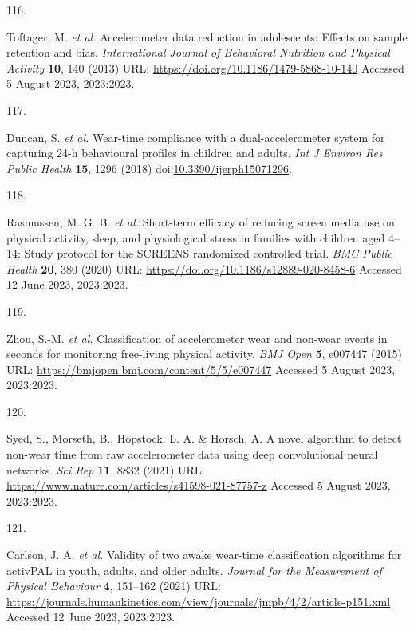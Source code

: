 \documentclass[
  10pt,
]{scrbook}
\newlength{\cslhangindent}
\newlength{\csllabelwidth}
\newlength{\cslentryspacingunit} %
\newenvironment{CSLReferences}[2] %
 {%
  \setlength{\parindent}{0pt}
  \ifodd #1
  \let\oldpar\par
  \def\par{\hangindent=\cslhangindent\oldpar}
  \fi
  \setlength{\parskip}{#2\cslentryspacingunit}
 }%
 {}
\newcommand{\CSLLeftMargin}[1]{\parbox[t]{\csllabelwidth}{#1}}
\newcommand{\CSLRightInline}[1]{\parbox[t]{\linewidth - \csllabelwidth}{#1}\break}
\let\originaltextbf\textbf
\renewcommand{\textbf}[1]{\textcolor{color1}{\originaltextbf{#1}}}
\begin{document}
\begin{CSLReferences}{0}{0}
\leavevmode{}%
\CSLLeftMargin{116. }%
\CSLRightInline{Toftager, M. \emph{et al.} Accelerometer data reduction
in adolescents: Effects on sample retention and bias.
\emph{International Journal of Behavioral Nutrition and Physical
Activity} \textbf{10}, 140 (2013) URL:
\url{https://doi.org/10.1186/1479-5868-10-140} Accessed 5 August 2023,
2023:2023.}

\leavevmode{}%
\CSLLeftMargin{117. }%
\CSLRightInline{Duncan, S. \emph{et al.} Wear-time compliance with a
dual-accelerometer system for capturing 24-h behavioural profiles in
children and adults. \emph{Int J Environ Res Public Health} \textbf{15},
1296 (2018)
doi:\href{https://doi.org/10.3390/ijerph15071296}{10.3390/ijerph15071296}.}

\leavevmode{}%
\CSLLeftMargin{118. }%
\CSLRightInline{Rasmussen, M. G. B. \emph{et al.} Short-term efficacy of
reducing screen media use on physical activity, sleep, and physiological
stress in families with children aged 4--14: Study protocol for the
{SCREENS} randomized controlled trial. \emph{{BMC} Public Health}
\textbf{20}, 380 (2020) URL:
\url{https://doi.org/10.1186/s12889-020-8458-6} Accessed 12 June 2023,
2023:2023.}

\leavevmode{}%
\CSLLeftMargin{119. }%
\CSLRightInline{Zhou, S.-M. \emph{et al.} Classification of
accelerometer wear and non-wear events in seconds for monitoring
free-living physical activity. \emph{{BMJ} Open} \textbf{5}, e007447
(2015) URL: \url{https://bmjopen.bmj.com/content/5/5/e007447} Accessed 5
August 2023, 2023:2023.}

\leavevmode{}%
\CSLLeftMargin{120. }%
\CSLRightInline{Syed, S., Morseth, B., Hopstock, L. A. \& Horsch, A. A
novel algorithm to detect non-wear time from raw accelerometer data
using deep convolutional neural networks. \emph{Sci Rep} \textbf{11},
8832 (2021) URL:
\url{https://www.nature.com/articles/s41598-021-87757-z} Accessed 5
August 2023, 2023:2023.}

\leavevmode{}%
\CSLLeftMargin{121. }%
\CSLRightInline{Carlson, J. A. \emph{et al.} Validity of two awake
wear-time classification algorithms for {activPAL} in youth, adults, and
older adults. \emph{Journal for the Measurement of Physical Behaviour}
\textbf{4}, 151--162 (2021) URL:
\url{https://journals.humankinetics.com/view/journals/jmpb/4/2/article-p151.xml}
Accessed 12 June 2023, 2023:2023.}


\end{CSLReferences}
\end{document}
